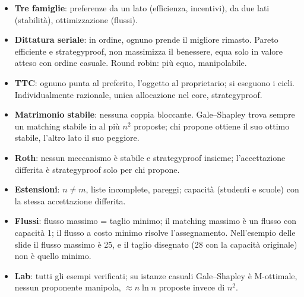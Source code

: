 \begin{riepilogo}
\begin{itemize}
  \item \textbf{Tre famiglie}: preferenze da un lato (efficienza, incentivi), da due lati
        (stabilità), ottimizzazione (flussi).
  \item \textbf{Dittatura seriale}: in ordine, ognuno prende il migliore rimasto. Pareto
        efficiente e strategyproof, non massimizza il benessere, equa solo in valore atteso
        con ordine casuale. Round robin: più equo, manipolabile.
  \item \textbf{TTC}: ognuno punta al preferito, l'oggetto al proprietario; si eseguono i
        cicli. Individualmente razionale, unica allocazione nel core, strategyproof.
  \item \textbf{Matrimonio stabile}: nessuna coppia bloccante. Gale--Shapley trova sempre
        un matching stabile in al più $n^2$ proposte; chi propone ottiene il suo ottimo
        stabile, l'altro lato il suo peggiore.
  \item \textbf{Roth}: nessun meccanismo è stabile e strategyproof insieme; l'accettazione
        differita è strategyproof solo per chi propone.
  \item \textbf{Estensioni}: $n \ne m$, liste incomplete, pareggi; capacità (studenti e
        scuole) con la stessa accettazione differita.
  \item \textbf{Flussi}: flusso massimo = taglio minimo; il matching massimo è un flusso
        con capacità 1; il flusso a costo minimo risolve l'assegnamento. Nell'esempio delle
        slide il flusso massimo è 25, e il taglio disegnato (28 con la capacità originale)
        non è quello minimo.
  \item \textbf{Lab}: tutti gli esempi verificati; su istanze casuali Gale--Shapley è
        M-ottimale, nessun proponente manipola, $\approx n\ln n$ proposte invece di $n^2$.
\end{itemize}
\end{riepilogo}
